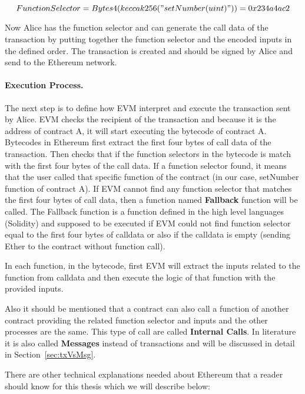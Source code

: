 \begin{equation}
    Function Selector = Bytes4(keccak256("setNumber(uint)")) = 0x234a4ac2
\end{equation}

Now Alice has the function selector and can generate the call data of the transaction by putting together the function selector and the encoded inputs in the defined order. The transaction is created and should be signed by Alice and send to the Ethereum network.

\paragraph{Execution Process. } 
The next step is to define how EVM interpret and execute the transaction sent by Alice. EVM checks the recipient of the transaction and because it is the address of contract A, it will start executing the bytecode of contract A. Bytecodes in Ethereum first extract the first four bytes of call data of the transaction. Then checks that if the function selectors in the bytecode is match with the first four bytes of the call data. If a function selector found, it means that the user called that specific function of the contract (in our case, setNumber function of contract A). If EVM cannot find any function selector that matches the first four bytes of call data, then a function named \textbf{Fallback} function will be called. The Fallback function is a function defined in the high level languages (\eg Solidity) and supposed to be executed if EVM could not find function selector equal to the first four bytes of calldata or also if the calldata is empty (\ie sending Ether to the contract without function call). 

In each function, in the bytecode, first EVM will extract the inputs related to the function from calldata and then execute the logic of that function with the provided inputs.

Also it should be mentioned that a contract can also call a function of another contract providing the related function selector and inputs and the other processes are the same. This type of call are called \textbf{Internal Calls}. In literature it is also called \textbf{Messages} instead of transactions and will be discussed in detail in Section~\ref{sec:txVsMsg}.

There are other technical explanations needed about Ethereum that a reader should know for this thesis which we will describe below:

